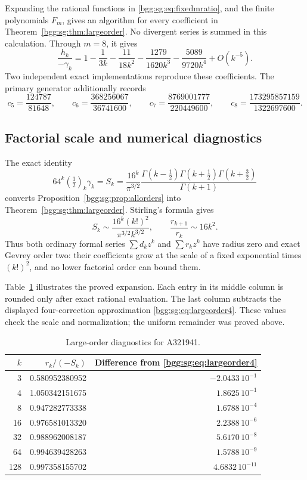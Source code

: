 \documentclass[11pt,a4paper]{article}
\numberwithin{equation}{section}
\theoremstyle{definition}
\theoremstyle{remark}
\theoremstyle{definition}
\begin{document}
Expanding the rational functions in \eqref{bgg:sg:eq:fixedmratio}, and the
finite polynomials \(F_m\), gives an algorithm for every coefficient
in Theorem~\ref{bgg:sg:thm:largeorder}.  No divergent series is summed in
this calculation.  Through \(m=8\), it gives
\[
 \frac{h_k}{-\gamma_k}
 =1-\frac1{3k}-\frac{11}{18k^2}
  -\frac{1279}{1620k^3}-\frac{5089}{9720k^4}+O(k^{-5}).
\]
Two independent exact implementations reproduce these coefficients.
The primary generator additionally records
\[
 c_5=\frac{124787}{81648},\qquad
 c_6=\frac{368256067}{36741600},\qquad
 c_7=\frac{8769001777}{220449600},\qquad
 c_8=\frac{173295857159}{1322697600}.
\]

\subsection{Factorial scale and numerical diagnostics}

The exact identity
\begin{equation}\label{bgg:sg:eq:scalegamma}
 64^k(\tfrac12)_k\gamma_k
 =S_k
 =\frac{16^k}{\pi^{3/2}}
   \frac{\Gamma(k-\tfrac12)\Gamma(k+\tfrac12)
         \Gamma(k+\tfrac32)}{\Gamma(k+1)}
\end{equation}
converts Proposition~\ref{bgg:sg:prop:allorders} into
Theorem~\ref{bgg:sg:thm:largeorder}.  Stirling's formula gives
\[
 S_k\sim\frac{16^k(k!)^2}{\pi^{3/2}k^{3/2}},
 \qquad \frac{r_{k+1}}{r_k}\sim16k^2.
\]
Thus both ordinary formal series \(\sum d_kz^k\) and
\(\sum r_kz^k\) have radius zero and exact Gevrey order two:
their coefficients grow at the scale of a fixed exponential times
\((k!)^2\), and no lower factorial order can bound them.

Table~\ref{bgg:sg:tab:signnumeric} illustrates the proved expansion.  Each
entry in its middle column is rounded only after exact rational
evaluation.  The last column subtracts the displayed four-correction
approximation \eqref{bgg:sg:eq:largeorder4}.  These values check the scale
and normalization; the uniform remainder was proved above.

\begin{table}[htbp]
\centering
\caption{Large-order diagnostics for A321941.}\label{bgg:sg:tab:signnumeric}
\begin{tabular}{rrr}
\toprule
\(k\)&\(r_k/(-S_k)\)&Difference from \eqref{bgg:sg:eq:largeorder4}\\
\midrule
3   &0.580952380952&\(-2.0433\,10^{-1}\)\\
4   &1.050342151675&\( 1.8625\,10^{-1}\)\\
8   &0.947282773338&\( 1.6788\,10^{-4}\)\\
16  &0.976581013320&\( 2.2388\,10^{-6}\)\\
32  &0.988962008187&\( 5.6170\,10^{-8}\)\\
64  &0.994639428263&\( 1.5788\,10^{-9}\)\\
128 &0.997358155702&\( 4.6832\,10^{-11}\)\\
\bottomrule
\end{tabular}
\end{table}
\end{document}
